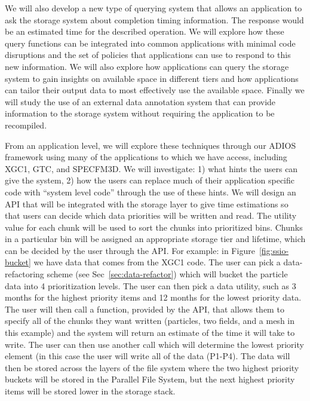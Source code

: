 We will also develop a new type of querying system that allows an application
to ask the storage system about completion timing information. The response
would be an estimated time for the described operation. We will explore
how these query functions can be integrated into common applications with
minimal code disruptions and the set of policies that applications can use to
respond to this new information. We will also explore how applications can
query the storage system to gain insights on available space in different tiers
and how applications can tailor their output data to most effectively use the available space.
Finally we will study the use of an external data annotation system that can
provide information to the storage system without requiring the application to
be recompiled. 

%
From an application level, we will explore these techniques through our ADIOS
framework using many of the applications to which we have access, including
XGC1, GTC, and SPECFM3D. We will investigate: 1) what hints the users can give
the system, 2) how the users can replace much of their
application specific code with
``system level code'' through the use of these hints.  We will design an API
that will be integrated with the storage layer to give time estimations so that
users can decide which data priorities will be written and read. The utility
value for each chunk will be used to sort the chunks into prioritized bins.
Chunks in a particular bin will be assigned an appropriate storage
 tier and lifetime, which can be decided by the user through the API.
For example: in Figure~\ref{fig:ssio-bucket} we have data that
comes from the XGC1 code.  The user can pick a data-refactoring scheme (see
Sec~\ref{sec:data-refactor}) which will bucket the particle data into 4
prioritization levels.  The user can then pick a data utility, such as 3 months
for the highest priority items and 12 months for the lowest priority data.
The user will then call a function, provided by the API, that allows them
to specify all of the chunks they want
written (particles, two fields, and a mesh in this example) and the system
will return an estimate of the time it will take to write. The user can then
use another call which will determine the lowest priority element (in this
case the user will write all of the data (P1-P4). The data will then be stored
across the layers of the file system where the two highest priority buckets
will be stored in the Parallel File System, but the next highest priority items
will be stored lower in the storage stack. 
%


